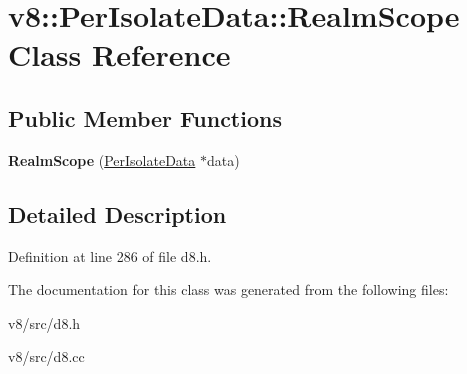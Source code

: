 \hypertarget{classv8_1_1PerIsolateData_1_1RealmScope}{}\section{v8\+:\+:Per\+Isolate\+Data\+:\+:Realm\+Scope Class Reference}
\label{classv8_1_1PerIsolateData_1_1RealmScope}
\subsection*{Public Member Functions}
\begin{DoxyCompactItemize}
\item 
\mbox{\label{classv8_1_1PerIsolateData_1_1RealmScope_a5779e979dff507151ee9340e6a8047d5}} 
{\bfseries Realm\+Scope} (\mbox{\hyperlink{classv8_1_1PerIsolateData}{Per\+Isolate\+Data}} $\ast$data)
\end{DoxyCompactItemize}


\subsection{Detailed Description}


Definition at line 286 of file d8.\+h.



The documentation for this class was generated from the following files\+:\begin{DoxyCompactItemize}
\item 
v8/src/d8.\+h\item 
v8/src/d8.\+cc\end{DoxyCompactItemize}
